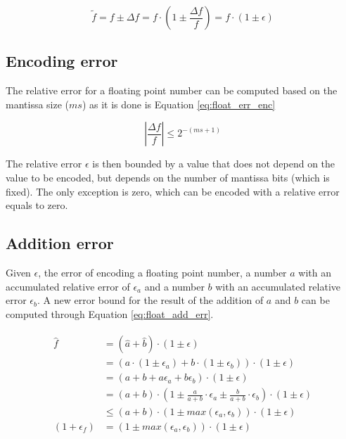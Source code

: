 \begin{equation}
	\tilde{f} = f \pm \Delta f = f \cdot \left(1 \pm \frac{\Delta f}{f} \right) = f \cdot (1 \pm \epsilon)
	\label{eq:float_error}
\end{equation}


\subsection{Encoding error}
The relative error for a floating point number can be computed based on the mantissa size ($ms$) as it is done is Equation \ref{eq:float_err_enc}

\begin{equation}
	\left| \frac{\Delta f}{f} \right| \leq 2^{-(ms+1)}
	\label{eq:float_err_enc}
\end{equation}

The relative error $\epsilon$ is then bounded by a value that does not depend on the value to be encoded, but depends on the number of mantissa bits (which is fixed). The only exception is zero, which can be encoded with a relative error equals to zero.

\subsection{Addition error}
Given $\epsilon$, the error of encoding a floating point number, a number $a$ with an accumulated relative error of $\epsilon_a$ and a number $b$ with an accumulated relative error $\epsilon_b$. A new error bound for the result of the addition of $a$ and $b$ can be computed through Equation \ref{eq:float_add_err}.

\begin{align}
\begin{split}
\hat{f} &= (\hat{a} + \hat{b}) \cdot (1 \pm \epsilon)\\
		&= (a \cdot (1 \pm \epsilon_a) + b \cdot (1 \pm \epsilon_b))\cdot (1 \pm \epsilon)\\
		&= (a + b + a \epsilon_a + b \epsilon_b) \cdot (1 \pm \epsilon) \\
		&= (a + b) \cdot \left(1 \pm \frac{a}{a + b} \cdot \epsilon_a \pm \frac{b}{a+b} \cdot \epsilon_b \right) \cdot (1 \pm \epsilon) \\
		&\leq (a+b) \cdot (1 \pm max(\epsilon_a, \epsilon_b)) \cdot (1 \pm \epsilon)\\
(1+\epsilon_f) &= (1 \pm max(\epsilon_a, \epsilon_b)) \cdot (1 \pm \epsilon)
\end{split}
\label{eq:float_add_err}
\end{align}

